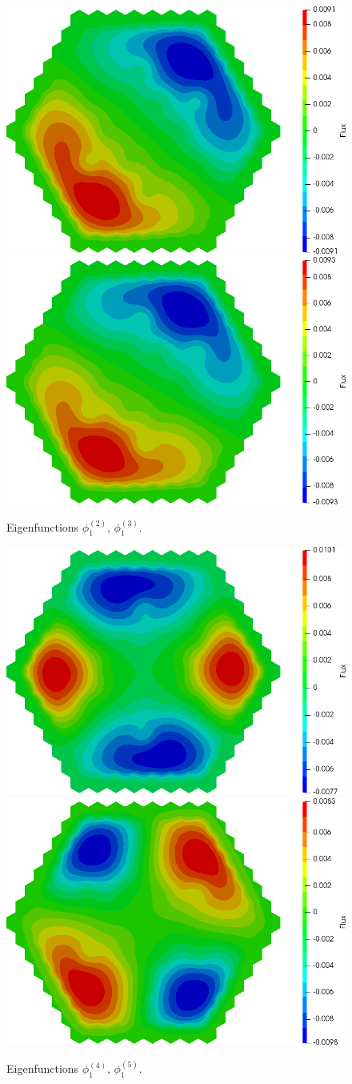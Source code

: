 \documentclass[authoryear]{elsarticle}
\begin{document}
\begin{figure}[h]
\begin{center}
	\includegraphics[width=0.49\linewidth]{iaea_with/alpha_delayed_sp3_u1_2.png}
	\includegraphics[width=0.49\linewidth]{iaea_with/alpha_delayed_sp3_u1_3.png}\\
	\caption{Eigenfunctions $\phi_1^{(2)}$, $\phi_1^{(3)}$.}
	\label{fig:iaea_with_fun_del_2}
\end{center}
\end{figure}

\begin{figure}[h]
\begin{center}
	\includegraphics[width=0.49\linewidth]{iaea_with/alpha_delayed_sp3_u1_4.png}
	\includegraphics[width=0.49\linewidth]{iaea_with/alpha_delayed_sp3_u1_5.png}\\
	\caption{Eigenfunctions $\phi_1^{(4)}$, $\phi_1^{(5)}$.}
	\label{fig:iaea_with_fun_del_3}
\end{center}
\end{figure}
\end{document}
